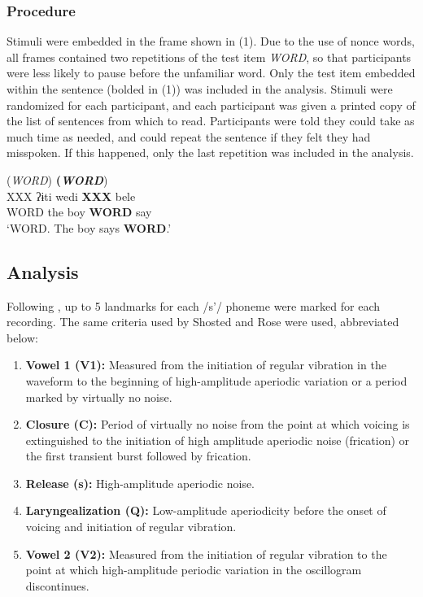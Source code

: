 \documentclass[output=paper
,newtxmath
,modfonts
,nonflat]{langsci/langscibook}
\begin{document}
\subsubsection{Procedure}\label{sec:moeng:5.1.2}

Stimuli were embedded in the frame shown in (1). Due to the use of nonce words, all frames contained two repetitions of the test item \textit{WORD}, so that participants were less likely to pause before the unfamiliar word. Only the test item embedded within the sentence (bolded in (1)) was included in the analysis. Stimuli were randomized for each participant, and each participant was given a printed copy of the list of sentences from which to read. Participants were told they could take as much time as needed, and could repeat the sentence if they felt they had misspoken. If this happened, only the last repetition was included in the analysis.

\ea
\glll (\textit{WORD})           \textbf{(\textit{WORD}})   \\
XXX    ʔɨti  wedi    \textbf{XXX}    bele\\
WORD  the  boy    \textbf{WORD}  say\\
\glt ‘WORD. The boy says \textbf{WORD}.’
\z

\subsection{Analysis}\label{sec:moeng:5.2}

Following \citet{shosted2011affricating}, up to 5 landmarks for each /s’/ phoneme were marked for each recording. The same criteria used by Shosted and Rose were used, abbreviated below:

\begin{enumerate}
	\item {\textbf{Vowel 1 (V1):} Measured from the initiation of regular vibration in the waveform to the beginning of high-amplitude aperiodic variation or a period marked by virtually no noise.}
\item {\textbf{Closure (C):} Period of virtually no noise from the point at which voicing is extinguished to the initiation of high amplitude aperiodic noise (frication) or the first transient burst followed by frication.}
\item {\textbf{Release (s):} High-amplitude aperiodic noise.}
\item {\textbf{Laryngealization (Q):} Low-amplitude aperiodicity before the onset of voicing and initiation of regular vibration.}
\item {\textbf{Vowel 2 (V2):} Measured from the initiation of regular vibration to the point at which high-amplitude periodic variation in the oscillogram discontinues.}
\end{enumerate}
\end{document}
